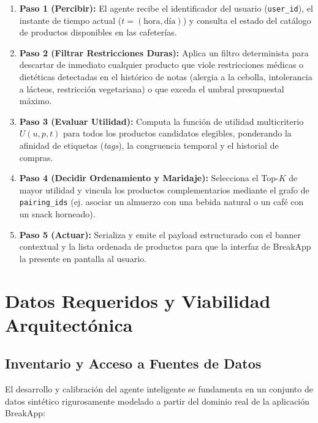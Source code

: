 \documentclass{article}
\begin{document}
\begin{enumerate}
    \item \textbf{Paso 1 (Percibir):} El agente recibe el identificador del usuario (\texttt{user\_id}), el instante de tiempo actual ($t = (\mathrm{hora}, \mathrm{día})$) y consulta el estado del catálogo de productos disponibles en las cafeterías.
    \item \textbf{Paso 2 (Filtrar Restricciones Duras):} Aplica un filtro determinista para descartar de inmediato cualquier producto que viole restricciones médicas o dietéticas detectadas en el histórico de notas (alergia a la cebolla, intolerancia a lácteos, restricción vegetariana) o que exceda el umbral presupuestal máximo.
    \item \textbf{Paso 3 (Evaluar Utilidad):} Computa la función de utilidad multicriterio $U(u, p, t)$ para todos los productos candidatos elegibles, ponderando la afinidad de etiquetas (\textit{tags}), la congruencia temporal y el historial de compras.
    \item \textbf{Paso 4 (Decidir Ordenamiento y Maridaje):} Selecciona el Top-$K$ de mayor utilidad y vincula los productos complementarios mediante el grafo de \texttt{pairing\_ids} (ej. asociar un almuerzo con una bebida natural o un café con un snack horneado).
    \item \textbf{Paso 5 (Actuar):} Serializa y emite el payload estructurado con el banner contextual y la lista ordenada de productos para que la interfaz de BreakApp la presente en pantalla al usuario.
\end{enumerate}

\section{Datos Requeridos y Viabilidad Arquitectónica}

\subsection{Inventario y Acceso a Fuentes de Datos}

El desarrollo y calibración del agente inteligente se fundamenta en un conjunto de datos sintético rigurosamente modelado a partir del dominio real de la aplicación BreakApp:
\end{document}
